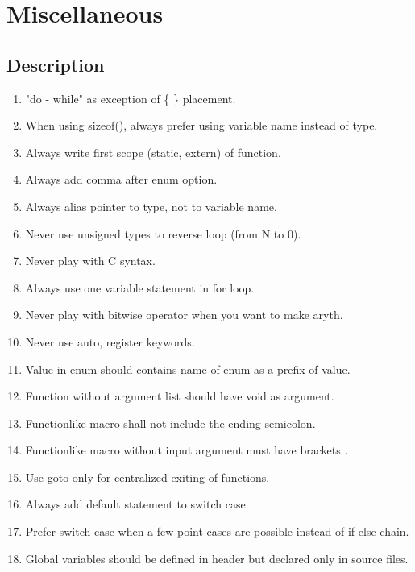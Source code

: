 \section{Miscellaneous}
\subsection{Description}
\begin{enumerate}
    \item "do - while" as exception of \{ \} placement.
    \item When using sizeof(), always prefer using variable name instead of type.
    \item Always write first scope (static, extern) of function.
    \item Always add comma after enum option.
    \item Always alias pointer to type, not to variable name.
    \item Never use unsigned types to reverse loop (from N to 0).
    \item Never play with C syntax. 
    \item Always use one variable statement in for loop.
    \item Never play with bitwise operator when you want to make aryth.
    \item Never use auto, register keywords.
    \item Value in enum should contains name of enum as a prefix of value.
    \item Function without argument list should have void as argument.
    \item Functionlike macro shall not include the ending semicolon.
    \item Functionlike macro without input argument must have brackets \(\).
    \item Use goto only for centralized exiting of functions.
    \item Always add default statement to switch case.
    \item Prefer switch case when a few point cases are possible instead of if else chain.
    \item Global variables should be defined in header but declared only in source files.
\end{enumerate}

